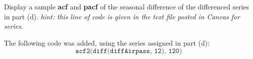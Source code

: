 Display a sample \textbf{acf} and \textbf{pacf} of the seasonal difference of the differenced series in part (d). \textit{hint: this line of code is given in the text file  posted in Canvas for  series}.

\nl The following code was added, using the series assigned in part (d):
$$\texttt{acf2(diff(diffAirpass, 12), 120)}$$
